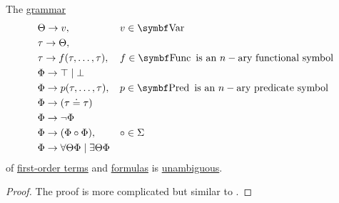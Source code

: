 \begin{proposition}\label{thm:first_order_formulas_are_unambiguous}
  The \hyperref[def:grammar]{grammar}
  \begin{equation*}
    \begin{aligned}
       & \Theta \to v,                                          &  & v \in \Bold{Var}                                                \\
       & \tau \to \Theta,                                       &  &                                                                 \\
       & \tau \to f(\tau, \ldots, \tau),                        &  & f \in \Bold{Func} \text{ is an } n-\text{ary functional symbol} \\
       & \Phi \to \top \;|\; \bot                               &  &                                                                 \\
       & \Phi \to p(\tau, \ldots, \tau),                        &  & p \in \Bold{Pred} \text{ is an } n-\text{ary predicate symbol}  \\
       & \Phi \to (\tau \doteq \tau)                            &  &                                                                 \\
       & \Phi \to \neg \Phi                                     &  &                                                                 \\
       & \Phi \to (\Phi \circ \Phi),                            &  & \circ \in \Sigma                                                \\
       & \Phi \to \forall \Theta \Phi \;|\; \exists \Theta \Phi &  &                                                                 \\
    \end{aligned}
  \end{equation*}
  of \hyperref[def:first_order_term]{first-order terms} and \hyperref[def:first_order_formula]{formulas} is \hyperref[def:ambiguous_grammar]{unambiguous}.
\end{proposition}
\begin{proof}
  The proof is more complicated but similar to .
\end{proof}

